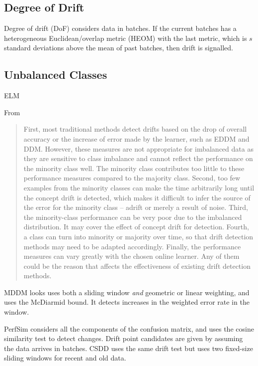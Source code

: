 \subsection{Degree of Drift}

Degree of drift (DoF) \cite{DoF} considers data in batches. If the current batches has a heterogeneous Euclidean/overlap metric (HEOM) with the last metric, which is $s$ standard deviations above the mean of past batches, then drift is signalled.

\subsection{Unbalanced Classes}

ELM 

From \cite{DDM_OCI}
\begin{quote}
  First,  most  traditional  methods  detect  drifts based on the drop of overall accuracy or the increase of error made  by  the  learner,  such  as  EDDM  and  DDM.  However, these  measures  are  not  appropriate  for  imbalanced  data  as they  are  sensitive  to  class  imbalance  and  cannot  reflect the  performance  on  the  minority  class  well.  The  minority class  contributes  too  little  to  these  performance  measures compared  to  the  majority  class.  Second,  too  few  examples from the minority classes can make the time arbitrarily long until  the  concept  drift  is  detected,  which  makes  it  difficult to  infer  the  source  of  the  error  for  the  minority  class  –  adrift  or  merely  a  result  of  noise.  Third,  the  minority-class  performance  can  be  very  poor  due  to  the  imbalanced distribution.  It  may  cover  the  effect  of  concept  drift  for detection. Fourth, a class can turn into minority or majority over  time,  so  that  drift  detection  methods  may  need  to  be adapted accordingly. Finally, the performance measures can vary  greatly  with  the  chosen  online  learner.  Any  of  them could be the reason that affects the effectiveness of existing drift detection methods.
\end{quote}



MDDM \cite{MDDM} looks uses both a sliding window {\it and} geometric or linear weighting, and uses the McDiarmid bound. It detects increases in the weighted error rate in the window.

PerfSim \cite{perfsim} considers all the components of the confusion matrix, and uses the cosine similarity test to detect changes. Drift point candidates are given by assuming the data arrives in batches. CSDD \cite{CSDD} uses the same drift test but uses two fixed-size sliding windows for recent and old data.

